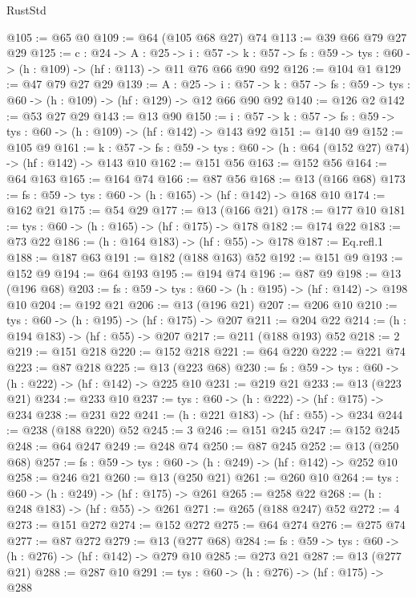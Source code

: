 \begin{lexlean}{RustStd}
\begin{coremodule}
@105 := @65 @0
@109 := @64 (@105 @68 @27) @74
@113 := @39 @66 @79 @27 @29
@125 := {c : @24} ->
  {A : @25} ->
  {i : @57} ->
  {k : @57} -> {fs : @59} -> {tys : @60} -> (h : @109) -> (hf : @113) -> @11 @76 @66 @90 @92
@126 := @104 @1
@129 := @47 @79 @27 @29
@139 := {A : @25} ->
  {i : @57} ->
  {k : @57} -> {fs : @59} -> {tys : @60} -> (h : @109) -> (hf : @129) -> @12 @66 @90 @92
@140 := @126 @2
@142 := @53 @27 @29
@143 := @13 @90
@150 := {i : @57} -> {k : @57} -> {fs : @59} -> {tys : @60} -> (h : @109) -> (hf : @142) -> @143 @92
@151 := @140 @9
@152 := @105 @9
@161 := {k : @57} ->
  {fs : @59} -> {tys : @60} -> (h : @64 (@152 @27) @74) -> (hf : @142) -> @143 @10
@162 := @151 @56
@163 := @152 @56
@164 := @64 @163
@165 := @164 @74
@166 := @87 @56
@168 := @13 (@166 @68)
@173 := {fs : @59} -> {tys : @60} -> (h : @165) -> (hf : @142) -> @168 @10
@174 := @162 @21
@175 := @54 @29
@177 := @13 (@166 @21)
@178 := @177 @10
@181 := {tys : @60} -> (h : @165) -> (hf : @175) -> @178
@182 := @174 @22
@183 := @73 @22
@186 := (h : @164 @183) -> (hf : @55) -> @178
@187 := Eq.refl.{1}
@188 := @187 @63
@191 := @182 (@188 @163) @52
@192 := @151 @9
@193 := @152 @9
@194 := @64 @193
@195 := @194 @74
@196 := @87 @9
@198 := @13 (@196 @68)
@203 := {fs : @59} -> {tys : @60} -> (h : @195) -> (hf : @142) -> @198 @10
@204 := @192 @21
@206 := @13 (@196 @21)
@207 := @206 @10
@210 := {tys : @60} -> (h : @195) -> (hf : @175) -> @207
@211 := @204 @22
@214 := (h : @194 @183) -> (hf : @55) -> @207
@217 := @211 (@188 @193) @52
@218 := 2
@219 := @151 @218
@220 := @152 @218
@221 := @64 @220
@222 := @221 @74
@223 := @87 @218
@225 := @13 (@223 @68)
@230 := {fs : @59} -> {tys : @60} -> (h : @222) -> (hf : @142) -> @225 @10
@231 := @219 @21
@233 := @13 (@223 @21)
@234 := @233 @10
@237 := {tys : @60} -> (h : @222) -> (hf : @175) -> @234
@238 := @231 @22
@241 := (h : @221 @183) -> (hf : @55) -> @234
@244 := @238 (@188 @220) @52
@245 := 3
@246 := @151 @245
@247 := @152 @245
@248 := @64 @247
@249 := @248 @74
@250 := @87 @245
@252 := @13 (@250 @68)
@257 := {fs : @59} -> {tys : @60} -> (h : @249) -> (hf : @142) -> @252 @10
@258 := @246 @21
@260 := @13 (@250 @21)
@261 := @260 @10
@264 := {tys : @60} -> (h : @249) -> (hf : @175) -> @261
@265 := @258 @22
@268 := (h : @248 @183) -> (hf : @55) -> @261
@271 := @265 (@188 @247) @52
@272 := 4
@273 := @151 @272
@274 := @152 @272
@275 := @64 @274
@276 := @275 @74
@277 := @87 @272
@279 := @13 (@277 @68)
@284 := {fs : @59} -> {tys : @60} -> (h : @276) -> (hf : @142) -> @279 @10
@285 := @273 @21
@287 := @13 (@277 @21)
@288 := @287 @10
@291 := {tys : @60} -> (h : @276) -> (hf : @175) -> @288

\end{coremodule}
\end{lexlean}
